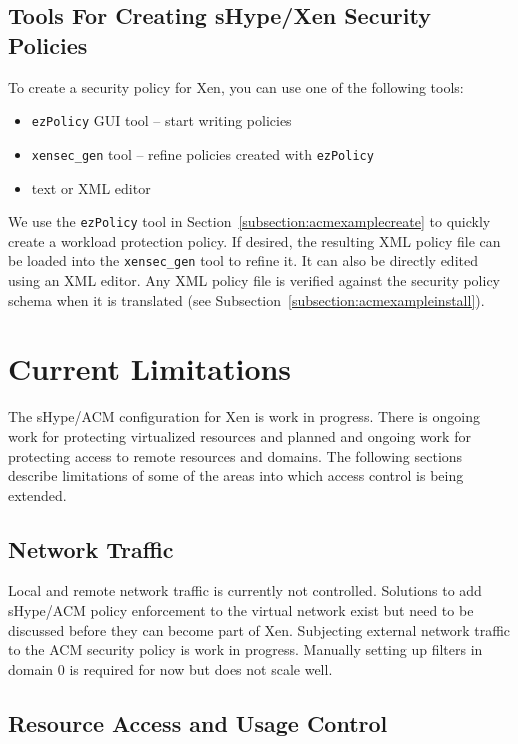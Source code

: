 \documentclass[11pt,twoside,final,openright]{report}
\begin{document}
\subsection{Tools For Creating sHype/Xen Security Policies}
To create a security policy for Xen, you can use one of the following
tools:
\begin{itemize}
\item \verb|ezPolicy| GUI tool -- start writing policies
\item \verb|xensec_gen| tool -- refine policies created with \verb|ezPolicy|
\item text or XML editor
\end{itemize}

We use the \verb|ezPolicy| tool in
Section~\ref{subsection:acmexamplecreate} to quickly create a workload
protection policy. If desired, the resulting XML policy file can be
loaded into the \verb|xensec_gen| tool to refine it. It can also be
directly edited using an XML editor. Any XML policy file is verified
against the security policy schema when it is translated (see
Subsection~\ref{subsection:acmexampleinstall}).

\section{Current Limitations}
\label{section:acmlimitations}

The sHype/ACM configuration for Xen is work in progress. There is
ongoing work for protecting virtualized resources and planned and
ongoing work for protecting access to remote resources and domains.
The following sections describe limitations of some of the areas into
which access control is being extended.

\subsection{Network Traffic}
Local and remote network traffic is currently not controlled.
Solutions to add sHype/ACM policy enforcement to the virtual network
exist but need to be discussed before they can become part of Xen.
Subjecting external network traffic to the ACM security policy is work
in progress. Manually setting up filters in domain 0 is required for
now but does not scale well.

\subsection{Resource Access and Usage Control}
\end{document}
